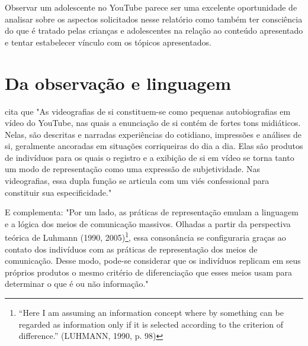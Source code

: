 Observar um adolescente no YouTube parece ser uma excelente oportunidade de analisar sobre os aspectos solicitados nesse relatório como também ter consciência do que é tratado pelas crianças e adolescentes na relação ao conteúdo apresentado e tentar estabelecer vínculo com os tópicos apresentados.

\section{Da observação e linguagem}

 cita que "As videografias de si constituem-se como pequenas autobiografias em vídeo do YouTube, nas quais a enunciação de si contém de fortes tons midiáticos. Nelas, são descritas e narradas experiências do cotidiano, impressões e análises de si, geralmente ancoradas em situações corriqueiras do dia a dia. Elas são produtos de indivíduos para os quais o registro e a exibição de si em vídeo se torna tanto um modo de representação como uma expressão de subjetividade. Nas videografias, essa dupla função se articula com um viés confessional para constituir sua especificidade."

E complementa: "Por um lado, as práticas de representação emulam a linguagem e a lógica dos meios de comunicação massivos. Olhadas a partir da perspectiva teórica de Luhmann (1990, 2005)\footnote{“Here I am assuming an information concept where by something can be regarded as information only if it is selected according to the criterion of difference.” (LUHMANN, 1990, p. 98)}, essa consonância se configuraria graças ao contato dos indivíduos com as práticas de representação dos meios de comunicação. Desse modo, pode-se considerar que os indivíduos replicam em seus próprios produtos o mesmo critério de diferenciação que esses meios usam para determinar o que é ou não informação."